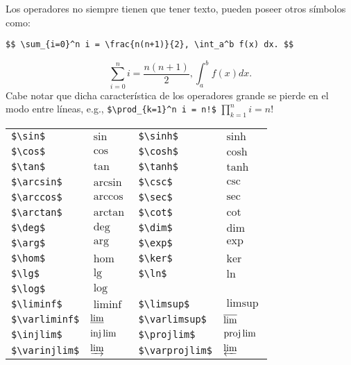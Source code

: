Los operadores no siempre tienen que tener texto, pueden poseer otros símbolos como:
\begin{lstlisting}[basicstyle=\footnotesize\ttfamily]
$$ \sum_{i=0}^n i = \frac{n(n+1)}{2}, \int_a^b f(x) dx. $$
\end{lstlisting}
$$ \sum_{i=0}^n i = \frac{n(n+1)}{2}, \int_a^b f(x) dx. $$
Cabe notar que dicha característica de los operadores grande se pierde en el modo entre líneas, e.g., \lstinline|$\prod_{k=1}^n i = n!$| $\prod_{k=1}^n i = n!$
\begin{longtable}{llll}
	\hline \hline
	\endhead
	\hline \hline
	\endfoot

	\lstinline|$\sin$|    & $\sin$    & \lstinline|$\sinh$|   & $\sinh$ \\
	\lstinline|$\cos$|    & $\cos$    & \lstinline|$\cosh$|   & $\cosh$ \\
	\lstinline|$\tan$|    & $\tan$    & \lstinline|$\tanh$|   & $\tanh$ \\
	\lstinline|$\arcsin$| & $\arcsin$ & \lstinline|$\csc$|    & $\csc$  \\
	\lstinline|$\arccos$| & $\arccos$ & \lstinline|$\sec$|    & $\sec$  \\
	\lstinline|$\arctan$| & $\arctan$ & \lstinline|$\cot$|    & $\cot$  \\

	\lstinline|$\deg$|    & $\deg$    & \lstinline|$\dim$|    & $\dim$ \\
	\lstinline|$\arg$|    & $\arg$    & \lstinline|$\exp$|    & $\exp$ \\
	\lstinline|$\hom$|    & $\hom$    & \lstinline|$\ker$|    & $\ker$ \\
	\lstinline|$\lg$|     & $\lg$     & \lstinline|$\ln$|     & $\ln$ \\
	\lstinline|$\log$|    & $\log$    &  \\
	\hline
	\lstinline|$\liminf$|    & $\liminf$    & \lstinline|$\limsup$|     & $\limsup$ \\
	\lstinline|$\varliminf$| & $\varliminf$ & \lstinline|$\varlimsup$|  & $\varlimsup$ \\
	\lstinline|$\injlim$|    & $\injlim$    & \lstinline|$\projlim$|    & $\projlim$ \\
	\lstinline|$\varinjlim$| & $\varinjlim$ & \lstinline|$\varprojlim$| & $\varprojlim$ \\


\end{longtable}
